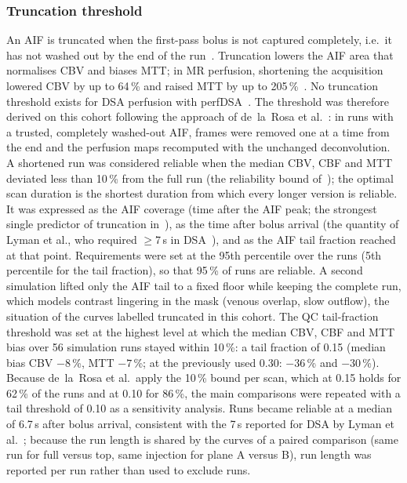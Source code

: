 \subsubsection{Truncation threshold}
\label{sec:truncation}
An AIF is truncated when the first-pass bolus is not captured completely, i.e.\ it has not washed out by the
end of the run~\cite{borst2015}. Truncation lowers the AIF area that normalises CBV and biases MTT; in MR
perfusion, shortening the acquisition lowered CBV by up to 64\,\% and raised MTT by up to 205\,\%~\cite{copen2014}.
No truncation threshold exists for DSA perfusion with perfDSA~\cite{su2025perfdsa}. The threshold was therefore
derived on this cohort following the approach of de~la~Rosa et al.~\cite{delarosa2023}: in runs with a trusted,
completely washed-out AIF, frames were removed one at a time from the end and the perfusion maps recomputed with
the unchanged deconvolution. A shortened run was considered reliable when the median CBV, CBF and MTT deviated
less than 10\,\% from the full run (the reliability bound of~\cite{delarosa2023}); the optimal scan duration is
the shortest duration from which every longer version is reliable. It was expressed as the AIF coverage (time
after the AIF peak; the strongest single predictor of truncation in~\cite{delarosa2023}), as the time after bolus
arrival (the quantity of Lyman et al., who required $\geq$7\,s in DSA~\cite{lyman2026}), and as the AIF tail
fraction reached at that point. Requirements were set at the 95th percentile over the runs (5th percentile for
the tail fraction), so that 95\,\% of runs are reliable. A second simulation lifted only the AIF tail to a fixed
floor while keeping the complete run, which models contrast lingering in the mask (venous overlap, slow
outflow), the situation of the curves labelled truncated in this cohort. The QC tail-fraction threshold was set at
the highest level at which the median CBV, CBF and MTT bias over 56 simulation runs stayed within 10\,\%:
a tail fraction of 0.15 (median bias CBV $-8$\,\%, MTT $-7$\,\%; at the previously used 0.30: $-36$\,\% and
$-30$\,\%). Because de~la~Rosa et al.\ apply the 10\,\% bound per scan, which at 0.15 holds for 62\,\% of the runs
and at 0.10 for 86\,\%, the main comparisons were repeated with a tail threshold of 0.10 as a sensitivity analysis.
Runs became reliable at a median of 6.7\,s after bolus arrival, consistent with the 7\,s reported for DSA by
Lyman et al.~\cite{lyman2026}; because the run length is shared by the curves of a paired comparison (same run
for full versus top, same injection for plane A versus B), run length was reported per run rather than used to
exclude runs.

